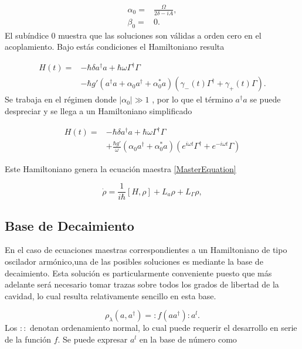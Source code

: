 \documentclass[10pt,a4paper]{report}
\begin{document}
\begin{align}
\alpha_0 =& \frac{\Omega}{2\delta-iA},\\
\beta_0 =& 0.
\end{align} El subíndice 0 muestra que las soluciones son válidas a orden cero en el acoplamiento. Bajo estás condiciones  el Hamiltoniano resulta

\begin{align}
H(t) =& -\hbar \delta a^{\dagger}a +\hbar\omega\Gamma^{\dagger}\Gamma \\
&-\hbar g'(a^{\dagger}a +\alpha_0 a^{\dagger}+\alpha^*_0 a)(\gamma_-(t)\Gamma^{\dagger}+\gamma_+(t)\Gamma)\nonumber.
\end{align}
Se trabaja en el régimen donde $|\alpha_0| \gg 1$
\cite{BarberisLC}, por lo que el término $a^\dagger a$ se puede
despreciar y se llega a un Hamiltoniano simplificado

\begin{align} \label{LCHamiltonian}
H(t) =& -\hbar \delta a^{\dagger}a +\hbar\omega\Gamma^{\dagger}\Gamma \\
&+\frac{\hbar g'}{\omega}(\alpha_0 a^{\dagger}+\alpha^*_0 a)(e^{i\omega t} \nonumber\Gamma^{\dagger}+e^{-i\omega t}\Gamma)
\end{align}

Este Hamiltoniano genera la ecuación maestra \eqref{MasterEquation}

\begin{equation}\label{LCMasterEq}
\dot{\rho} = \frac{1}{i\hbar}[H,\rho] +L_a\rho + L_\Gamma \rho,
\end{equation} 


\subsection{Base de Decaimiento}

En el caso de ecuaciones maestras correspondientes a un Hamiltoniano
de tipo oscilador armónico,una de las posibles soluciones es mediante la base de decaimiento\cite{EnglertDB}. Esta solución es particularmente conveniente puesto que más adelante será necesario tomar trazas sobre todos los grados de libertad de la cavidad, lo cual resulta relativamente sencillo en esta base.

\begin{equation}\label{Englert1993}
\rho_\lambda (a,a^\dagger) = :f(aa^\dagger):a^l.
\end{equation} Los $::$ denotan ordenamiento normal, lo cual puede requerir el desarrollo en serie de la función $f$. Se puede expresar $a^l$ en la base de número como
\end{document}

